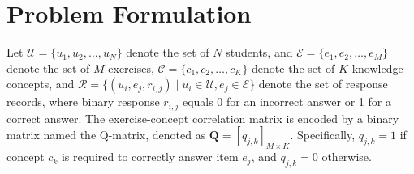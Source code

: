 \documentclass[a4paper,runningheads]{llncs}
\begin{document}



\section{Problem Formulation}

Let $\mathcal{U} = \{u_1, u_2, \dots, u_N\}$ denote the set of $N$ students, and $\mathcal{E} = \{e_1, e_2, \dots, e_M\}$ denote the set of $M$ exercises, $\mathcal{C} = \{c_1, c_2, \dots, c_K\}$ denote the set of $K$ knowledge concepts, and $\mathcal{R}=\{(u_i,e_j,r_{i,j})\mid u_i\in\mathcal{U}, e_j\in\mathcal{E}\}$ denote the set of response records, where binary response $r_{i,j}$ equals 0 for an incorrect answer or 1 for a correct answer.
The exercise-concept correlation matrix is encoded by a binary matrix named the Q-matrix, denoted as $\bm{Q}=[q_{j,k}]_{M \times K}$. Specifically, $q_{j,k}=1$ if concept $c_k$ is required to correctly answer item $e_j$, and $q_{j,k}=0$ otherwise.
\end{document}
